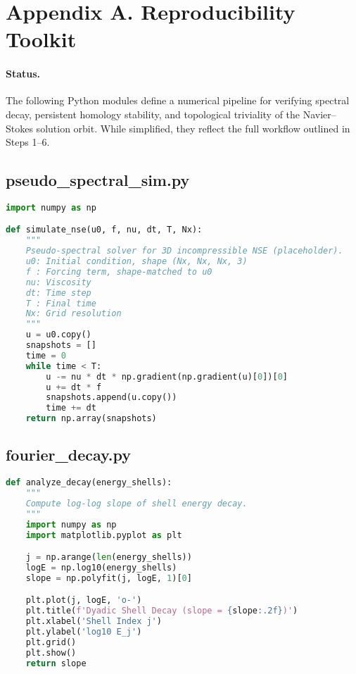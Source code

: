 \documentclass[11pt]{article}
\theoremstyle{definition}
\begin{document}

\section{Appendix A. Reproducibility Toolkit}
\label{sec:appendixA}

\paragraph{Status.}
The following Python modules define a numerical pipeline for verifying spectral decay, persistent homology stability, and topological triviality of the Navier--Stokes solution orbit. While simplified, they reflect the full workflow outlined in Steps 1–6.

\subsection*{pseudo\_spectral\_sim.py}
\begin{lstlisting}[language=Python]
import numpy as np

def simulate_nse(u0, f, nu, dt, T, Nx):
    """
    Pseudo-spectral solver for 3D incompressible NSE (placeholder).
    u0: Initial condition, shape (Nx, Nx, Nx, 3)
    f : Forcing term, shape-matched to u0
    nu: Viscosity
    dt: Time step
    T : Final time
    Nx: Grid resolution
    """
    u = u0.copy()
    snapshots = []
    time = 0
    while time < T:
        u -= nu * dt * np.gradient(np.gradient(u)[0])[0]
        u += dt * f
        snapshots.append(u.copy())
        time += dt
    return np.array(snapshots)
\end{lstlisting}

\subsection*{fourier\_decay.py}
\begin{lstlisting}[language=Python]
def analyze_decay(energy_shells):
    """
    Compute log-log slope of shell energy decay.
    """
    import numpy as np
    import matplotlib.pyplot as plt

    j = np.arange(len(energy_shells))
    logE = np.log10(energy_shells)
    slope = np.polyfit(j, logE, 1)[0]

    plt.plot(j, logE, 'o-')
    plt.title(f'Dyadic Shell Decay (slope = {slope:.2f})')
    plt.xlabel('Shell Index j')
    plt.ylabel('log10 E_j')
    plt.grid()
    plt.show()
    return slope
\end{lstlisting}
\end{document}
